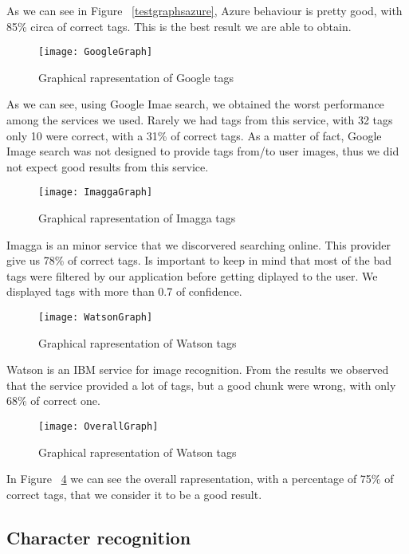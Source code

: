 As we can see in Figure~ \ref{testgraphsazure}, Azure behaviour is pretty good, with 85\% circa of correct tags. This is the best result we are able to obtain.

\begin{figure}[H]
\centering
\texttt{[image: GoogleGraph]}
\caption{Graphical rapresentation of Google tags}
\label{testgraphgoogle}
\end{figure}

As we can see, using Google Imae search, we obtained the worst performance among the services we used. Rarely we had tags from this service, with 32 tags only 10 were correct, with a 31\% of correct tags. As a matter of fact, Google Image search was not designed to provide tags from/to user images, thus we did not expect good results from this service.

\begin{figure}[H]
\centering
\texttt{[image: ImaggaGraph]}
\caption{Graphical rapresentation of Imagga tags}
\label{testgraphimagga}
\end{figure}

Imagga is an minor service that we discorvered searching online. This provider give us 78\% of correct tags. Is important to keep in mind that most of the bad tags were filtered by our application before getting diplayed to the user. We displayed tags with more than 0.7 of confidence.

\begin{figure}[H]
\centering
\texttt{[image: WatsonGraph]}
\caption{Graphical rapresentation of Watson tags}
\label{testgraphwatson}
\end{figure}

Watson is an IBM service for image recognition. From the results we observed that the service provided a lot of tags, but a good chunk were wrong, with only 68\% of correct one.

\begin{figure}[H]
\centering
\texttt{[image: OverallGraph]}
\caption{Graphical rapresentation of Watson tags}
\label{testgraphoverall}
\end{figure}

In Figure~ \ref{testgraphoverall} we can see the overall rapresentation, with a percentage of 75\% of correct tags, that we consider it to be a good result.

\subsection{Character recognition}

